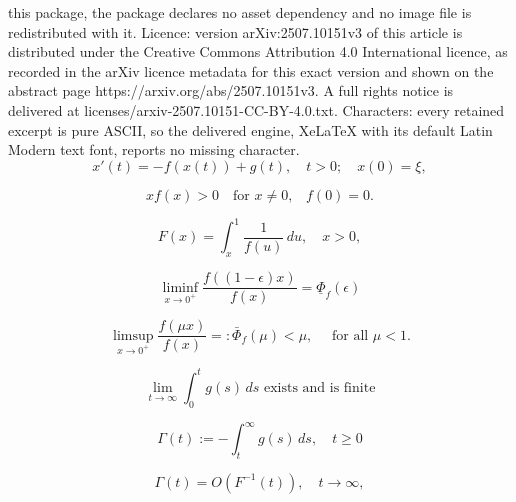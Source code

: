 \documentclass[10pt,a4paper]{amsart}
\begin{document}
this package, the package declares no asset dependency and no image file is redistributed with it. Licence: version arXiv:2507.10151v3 of this article is distributed under the Creative Commons Attribution 4.0 International licence, as recorded in the arXiv licence metadata for this exact version and shown on the abstract page https://arxiv.org/abs/2507.10151v3. A full rights notice is delivered at licenses/arxiv-2507.10151-CC-BY-4.0.txt. Characters: every retained excerpt is pure ASCII, so the delivered engine, XeLaTeX with its default Latin Modern text font, reports no missing character.
	\begin{equation} \label{eq.odepert}
		x'(t)=-f(x(t))+g(t), \quad t>0; \quad x(0)=\xi,
	\end{equation}

	\begin{equation} \label{eq.fglobalstable}
		xf(x)>0 \quad\text{for $x\neq 0$,} \quad f(0)=0.
	\end{equation}

	\begin{equation} \label{def.F}
		F(x)=\int_x^1 \frac{1}{f(u)}\,du, \quad x>0,
	\end{equation}

	\begin{equation} \label{eq.fasypres}
		\liminf_{x\to 0^+} \frac{f((1-\epsilon)x)}{f(x)}= \underline{\Phi}_f(\epsilon)
	\end{equation}

	\begin{equation} \label{eq.fasypresmu}
		\limsup_{x\to 0^+} \frac{f(\mu x)}{f(x)}=:\bar{\Phi}_f(\mu)<\mu, \quad \text{ for all $\mu<1$}.
	\end{equation}

	\begin{equation} \label{eq.g2}
		\lim_{t\to\infty} \int_0^t g(s)\,ds \text{ exists and is finite}
	\end{equation}

	\begin{equation} \label{eq:Gamma}
		\Gamma(t):=-\int_t^\infty g(s)\,ds, \quad t\geq 0
	\end{equation}

	\begin{equation} \label{eq.GammaOFinv}
		\Gamma(t)=O(F^{-1}(t)), \quad t\to\infty,
	\end{equation}
\end{document}
